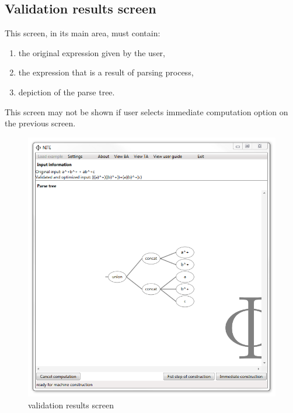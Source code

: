 \documentclass{article}
\begin{document}
\newpage

\subsection{Validation results screen}
This screen, in its main area, must contain:
\begin{enumerate}

  \item the original expression given by the user,

  \item the expression that is a result of parsing process,

  \item depiction of the parse tree.

\end{enumerate}

\vspace{10pt} \noindent
This screen may not be shown if user selects immediate computation option on the previous screen.

\begin{figure}[ht!]
  \centering
  \includegraphics[width=.9\textwidth]{../../graphics/Screen2.png}
  \caption{validation results screen}
\end{figure}

\newpage
\end{document}
